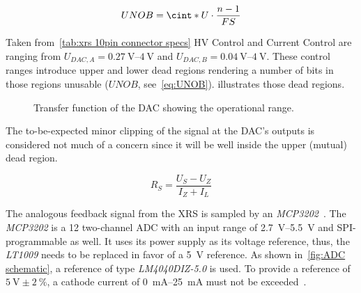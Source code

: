 

            \begin{align}
                UNOB = \cint*{ U \cdot \frac{n - 1}{FS}}
                \label{eq:UNOB}
            \end{align}

            Taken from~\cref{tab:xrs 10pin connector specs} HV Control and Current Control are ranging from \(U_{DAC,A} = \qtyrange{0.27}{4}{\volt}\) and \(U_{DAC,B} = \qtyrange{0.04}{4}{\volt}\).
            These control ranges introduce upper and lower dead regions rendering a number of bits in those regions unusable (\(UNOB\), see~\cref{eq:UNOB}).
             illustrates those dead regions.

            \begin{figure}[h]
                \centering
                
                \caption[Transfer function of the DAC showing the operational range]{Transfer function of the DAC showing the operational range.}%
                \label{fig:transfer function DAC}
            \end{figure}

            The to-be-expected minor clipping of the signal at the DAC's outputs is considered not much of a concern since it will be well inside the upper (mutual) dead region.

            \begin{equation}
                R_S = \frac{U_S - U_Z}{I_Z + I_L}
                \label{eq:LM4040 cathode current}
            \end{equation}

            The analogous feedback signal from the XRS is sampled by an \textit{MCP3202}~\cite{Manual.ADC.MCP3202}.
            The \textit{MCP3202} is a \qty{12}{\bit} two-channel ADC with an input range of \qtyrange{2.7}{5.5}{\volt} and SPI-programmable as well.
            It uses its power supply as its voltage reference, thus, the \textit{LT1009} needs to be replaced in favor of a \qty{5}{\volt} reference.
            As shown in~\cref{fig:ADC schematic}, a reference of type \textit{LM4040DIZ-5.0} is used.
            To provide a reference of \(\qty{5}{\volt} \pm \qty{2}{\percent}\), a cathode current of \qtyrange{0}{25}{\milli\ampere} must not be exceeded~\cite{Manual.LM4040PrecisionMicropowerShuntVoltageReference}.

